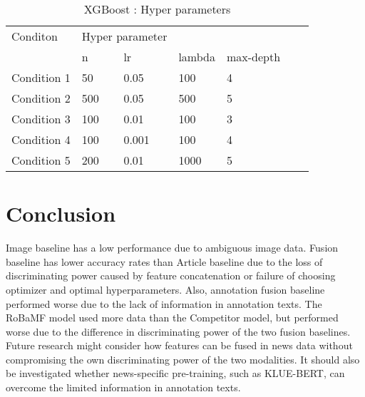 \documentclass{article}
\begin{document}
\begin{table}[htbp]
\centering
\caption{XGBoost : Hyper parameters}
\label{your-label}
\begin{tabular}{@{}lllllll@{}}
\toprule
Conditon     & \multicolumn{2}{c}{Hyper parameter} \\
             & n      & lr      & lambda      & max-depth     \\
Condition 1   & 50         & 0.05         & 100         & 4        \\
Condition 2   & 500         & 0.05         & 500         & 5       \\
Condition 3   & 100         & 0.01         & 100         & 3       \\
Condition 4   & 100         & 0.001        & 100         & 4       \\
Condition 5   & 200         & 0.01        & 1000         & 5       \\
\bottomrule
\end{tabular}
\end{table}

\section{Conclusion}
Image baseline has a low performance due to ambiguous image data. Fusion baseline has lower accuracy rates than Article baseline due to the loss of discriminating power caused by feature concatenation or failure of choosing optimizer and optimal hyperparameters. Also, annotation fusion baseline performed worse due to the lack of information in annotation texts.
The RoBaMF model used more data than the Competitor model, but performed worse due to the difference in discriminating power of the two fusion baselines.
Future research might consider how features can be fused in news data without compromising the own discriminating power of the two modalities.
It should also be investigated whether news-specific pre-training, such as KLUE-BERT, can overcome the limited information in annotation texts.





\end{document}
